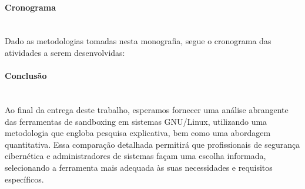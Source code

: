\paragraph*{Cronograma} \mbox{} \\
Dado as metodologias tomadas nesta monografia, segue o cronograma das atividades a serem desenvolvidas:



\paragraph*{Conclusão} \mbox{}\\
Ao final da entrega deste trabalho, esperamos fornecer uma análise abrangente das ferramentas de sandboxing em sistemas GNU/Linux, utilizando uma metodologia que engloba pesquisa explicativa, bem como uma abordagem quantitativa. Essa comparação detalhada permitirá que profissionais de segurança cibernética e administradores de sistemas façam uma escolha informada, selecionando a ferramenta mais adequada às suas necessidades e requisitos específicos.
